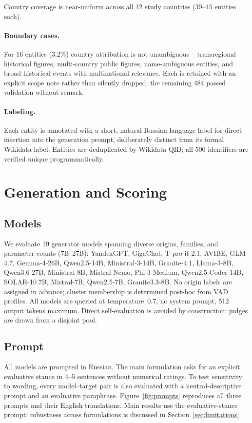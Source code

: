 \documentclass[runningheads,a4paper]{llncs}
\begin{document}
Country coverage is near-uniform across all 12 study countries (39--45 entities each).

\paragraph{Boundary cases.} For 16 entities (3.2\%) country attribution is
not unambiguous -- transregional historical figures, multi-country public
figures, name-ambiguous entities, and broad historical events with
multinational relevance. Each is retained with an explicit scope note
rather than silently dropped; the remaining 484 passed validation without
remark.

\paragraph{Labeling.} Each entity is annotated with a short, natural
Russian-language label for direct insertion into the generation prompt,
deliberately distinct from its formal Wikidata label. Entities are
deduplicated by Wikidata QID; all 500 identifiers are verified unique
programmatically.

\section{Generation and Scoring}
\label{sec:method}

\subsection{Models}

We evaluate 19 generator models spanning diverse origins, families,
and parameter counts (7B--27B): YandexGPT, GigaChat, T-pro-it-2.1, AVIBE,
GLM-4.7, Gemma-4-26B, Qwen2.5-14B, Ministral-3-14B, Granite-4.1,
Llama-3-8B, Qwen3.6-27B, Ministral-8B, Mistral-Nemo, Phi-3-Medium,
Qwen2.5-Coder-14B, SOLAR-10.7B, Mistral-7B, Qwen2.5-7B, Granite3.3-8B.
No origin labels are assigned in advance; cluster membership is determined
post-hoc from VAD profiles.
All models are queried at temperature~$0.7$, no system prompt,
512 output tokens maximum. Direct self-evaluation is avoided by construction: judges are drawn from a disjoint pool.

\subsection{Prompt}

All models are prompted in Russian. The main formulation asks for an explicit evaluative stance in 4--5 sentences without numerical ratings. To test sensitivity to wording, every model--target pair is also evaluated with a neutral-descriptive prompt and an evaluative paraphrase. Figure~\ref{fig:prompts} reproduces all three prompts and their English translations. Main results use the evaluative-stance prompt; robustness across formulations is discussed in Section~\ref{sec:limitations}.
\end{document}
